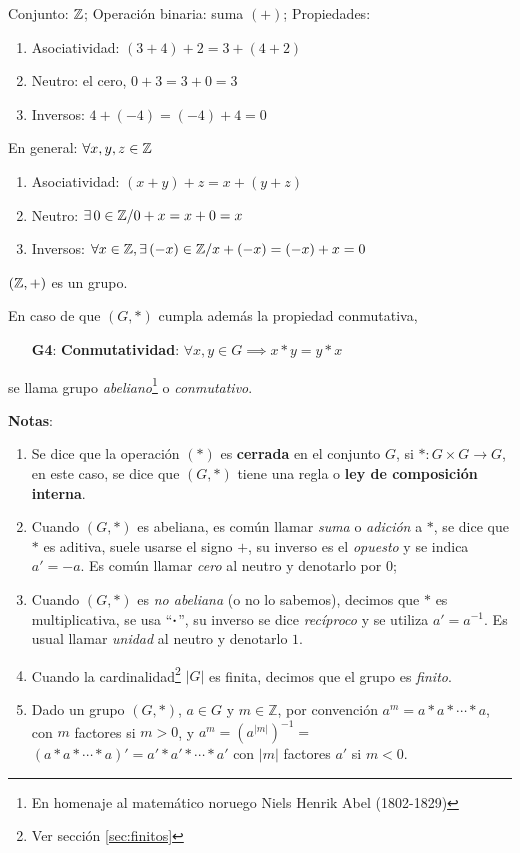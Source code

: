 \begin{fmd-example}
	Conjunto: $\mathbb{Z}$; Operación binaria: suma $(+)$; Propiedades:
	\begin{enumerate}
		\item Asociatividad: $(3 + 4) + 2 = 3 + (4 + 2)$
		\item Neutro: el cero, $0 + 3 = 3 + 0 = 3$
		\item Inversos: $4 + (-4) = (-4) + 4 = 0$
	\end{enumerate}
	En general: $\forall x, y, z \in \mathbb{Z}$
	\begin{enumerate}
		\item Asociatividad: $(x + y) + z = x + (y + z)$
		\item Neutro: $\exists \, 0 \in \mathbb{Z} / 0 + x = x + 0 = x$
		\item Inversos: $\forall x \in \mathbb{Z} , \exists \, (-x) \in \mathbb{Z} / x + (-x) = (-x) + x = 0$
	\end{enumerate}
	$(\mathbb{Z}, +)$ es un grupo.
\end{fmd-example}


\begin{fmd-definition}
	En caso de que $(G, *)$ cumpla además la propiedad conmutativa,
	
	\begin{enumerate}
		\item[\textbf{G4}:] \textbf{Conmutatividad}: $\forall x, y \in G \implies x*y = y*x$
	\end{enumerate}
	se llama grupo \textit{abeliano}\footnote{En homenaje al matemático noruego Niels Henrik Abel (1802-1829)} o \textit{conmutativo}.
\end{fmd-definition}


\textbf{Notas}:
\begin{enumerate}[label=\roman*)]
	\item Se dice que la operación $(*)$ es \textbf{cerrada} en el conjunto $G$, si $*: G \times G \rightarrow G$, en este caso, se dice que $(G, *)$ tiene una regla o \textbf{ley de composición interna}.
	
	\item Cuando $(G, *)$ es abeliana, es común llamar \textit{suma} o \textit{adición} a $*$, se dice que $*$ es aditiva, suele usarse el signo $+$, su inverso es el \textit{opuesto} y se indica $a' = -a$. Es común llamar \textit{cero} al neutro y denotarlo por $0$;
	\item Cuando $(G, *)$ es \textit{no abeliana} (o no lo sabemos), decimos que $*$ es multiplicativa, se usa ``$\boldsymbol{\cdot}$'', su inverso se dice \textit{recíproco} y se utiliza $a' = a^{-1}$. Es usual llamar \textit{unidad} al neutro y denotarlo $1$.
	\item Cuando la cardinalidad\footnote{Ver sección \ref{sec:finitos}} $|G|$ es finita, decimos que el grupo es \textit{finito}.
	\item Dado un grupo $(G, *)$, $a\in G$ y $m \in \mathbb{Z}$, por convención $a^m = a*a* \cdots *a$, con $m$ factores si $m>0$, y $a^m = (a^{|m|})^{-1} =$ $\left(a*a* \cdots *a\right)' = a'*a'* \cdots *a'$ con $|m|$ factores $a'$ si $m<0$.
\end{enumerate}


